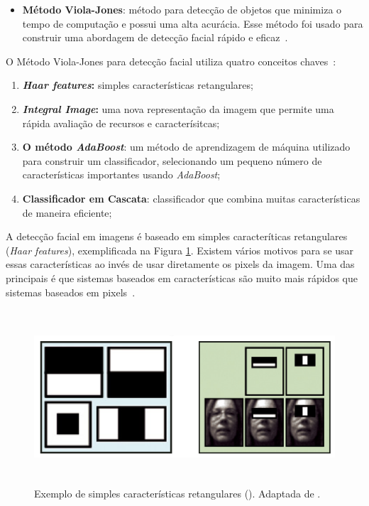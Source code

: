 	\begin{itemize}
		\item \textbf{Método Viola-Jones}: método para detecção de objetos que minimiza o tempo de computação e possui uma alta acurácia. Esse método foi usado para construir uma abordagem de detecção facial rápido e eficaz~\cite{violajones}.
	\end{itemize}

O Método Viola-Jones para detecção facial utiliza quatro conceitos chaves~\cite{servodetection,violajones}:
	
	\begin{enumerate}
		\item \textbf{\textit{Haar features}:} simples características retangulares;
		\item \textbf{\textit{Integral Image}:} uma nova representação da imagem que permite uma rápida avaliação de recursos e caracterísitcas;
		\item \textbf{O método \textit{AdaBoost}}: um método de aprendizagem de máquina utilizado para construir um classificador,  selecionando um pequeno número de características importantes usando \textit{AdaBoost};
		\item \textbf{Classificador em Cascata}: classificador que combina muitas características de maneira eficiente;
	\end{enumerate}

A detecção facial em imagens é baseado em simples caracteríticas retangulares (\textit{Haar features}), exemplificada na Figura \ref{haarfeatures}. Existem vários motivos para se usar essas características ao invés de usar diretamente os pixels da imagem. Uma das principais é que sistemas baseados em características são muito mais rápidos que sistemas baseados em pixels~\cite{violajones}. 

	\begin{figure}[hbt]
		\begin{center}
			\includegraphics[height=6.5cm,width=12.5cm]{figuras/2.FundamentacaoTeorica/haar_features.png}
		\end{center}
		\caption{Exemplo de simples características retangulares (). Adaptada de \cite{servodetection}.}
		\label{haarfeatures}
	\end{figure}

